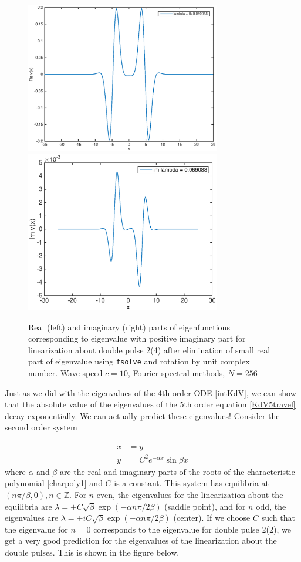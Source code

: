 \documentclass[12pt]{article}
\def\Z{{\mathbb Z}}
\begin{document}
\begin{figure}[H]
	\includegraphics[width=8.5cm]{four10dp2eigenfnsreal_after}
	\includegraphics[width=8.5cm]{four10dp2eigenfnsimag_after}
	\caption{Real (left) and imaginary (right) parts of eigenfunctions corresponding to eigenvalue with positive imaginary part for linearization about double pulse 2(4) after elimination of small real part of eigenvalue using \texttt{fsolve} and rotation by unit complex number. Wave speed $c = 10$, Fourier spectral methods, $N = 256$}
\end{figure}

Just as we did with the eigenvalues of the 4th order ODE \eqref{intKdV}, we can show that the absolute value of the eigenvalues of the 5th order equation \eqref{KdV5travel} decay exponentially. We can actually predict these eigenvalues! Consider the second order system

\begin{align*}
\dot{x} &= y \\
\dot{y} &= C^2 e^{-\alpha x} \sin{\beta x}
\end{align*}
where $\alpha$ and $\beta$ are the real and imaginary parts of the roots of the characteristic polynomial \eqref{charpoly1} and $C$ is a constant. This system has equilibria at $(n \pi / \beta, 0), n \in \Z$. For $n$ even, the eigenvalues for the linearization about the equilibria are $\lambda = \pm C \sqrt{\beta}\exp{(-\alpha n \pi / 2 \beta)}$ (saddle point), and for $n$ odd, the eigenvalues are $\lambda = \pm i C \sqrt{\beta}\exp{(-\alpha n \pi / 2 \beta)}$ (center). If we choose $C$ such that the eigenvalue for $n = 0$ corresponds to the eigenvalue for double pulse 2(2), we get a very good prediction for the eigenvalues of the linearization about the double pulses. This is shown in the figure below.
\end{document}
